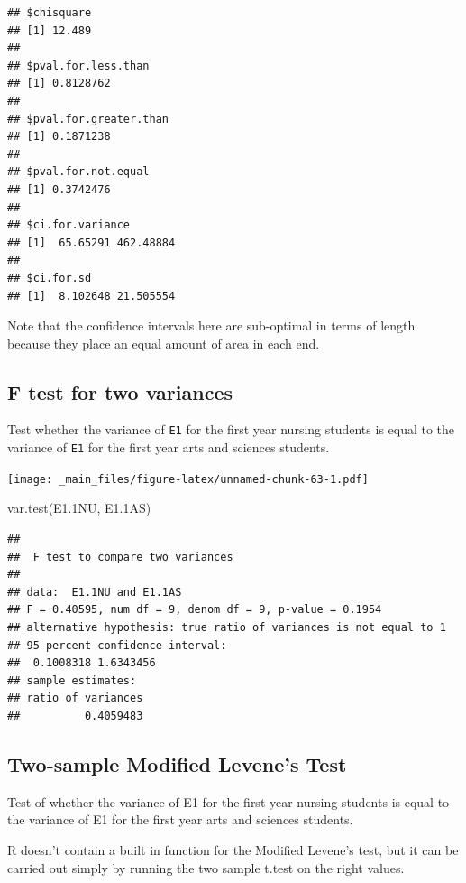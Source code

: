 \documentclass[
]{book}
\newenvironment{Shaded}{\begin{snugshade}}{\end{snugshade}}
\newcommand{\FloatTok}[1]{\textcolor[rgb]{0.00,0.00,0.81}{#1}}
\newcommand{\FunctionTok}[1]{\textcolor[rgb]{0.00,0.00,0.00}{#1}}
\newcommand{\NormalTok}[1]{#1}
\begin{document}
\begin{verbatim}
## $chisquare
## [1] 12.489
## 
## $pval.for.less.than
## [1] 0.8128762
## 
## $pval.for.greater.than
## [1] 0.1871238
## 
## $pval.for.not.equal
## [1] 0.3742476
## 
## $ci.for.variance
## [1]  65.65291 462.48884
## 
## $ci.for.sd
## [1]  8.102648 21.505554
\end{verbatim}

Note that the confidence intervals here are sub-optimal in terms of length because they place an equal amount of area in each end.

\hypertarget{f-test-for-two-variances}{%
\subsection{F test for two variances}\label{f-test-for-two-variances}}

Test whether the variance of \texttt{E1} for the first year nursing students is equal to the variance of \texttt{E1} for the first year arts and sciences students.

\texttt{[image: \_main\_files/figure-latex/unnamed-chunk-63-1.pdf]}

\begin{Shaded}
\begin{Highlighting}[]
\FunctionTok{var.test}\NormalTok{(E1}\FloatTok{.1}\NormalTok{NU, E1}\FloatTok{.1}\NormalTok{AS)}
\end{Highlighting}
\end{Shaded}

\begin{verbatim}
## 
##  F test to compare two variances
## 
## data:  E1.1NU and E1.1AS
## F = 0.40595, num df = 9, denom df = 9, p-value = 0.1954
## alternative hypothesis: true ratio of variances is not equal to 1
## 95 percent confidence interval:
##  0.1008318 1.6343456
## sample estimates:
## ratio of variances 
##          0.4059483
\end{verbatim}

\hypertarget{two-sample-modified-levenes-test}{%
\subsection{Two-sample Modified Levene's Test}\label{two-sample-modified-levenes-test}}

Test of whether the variance of E1 for the first year nursing students is equal to the variance of E1 for the first year arts and sciences students.

R doesn't contain a built in function for the Modified Levene's test, but it can be carried out simply by running the two sample t.test on the right values.
\end{document}
